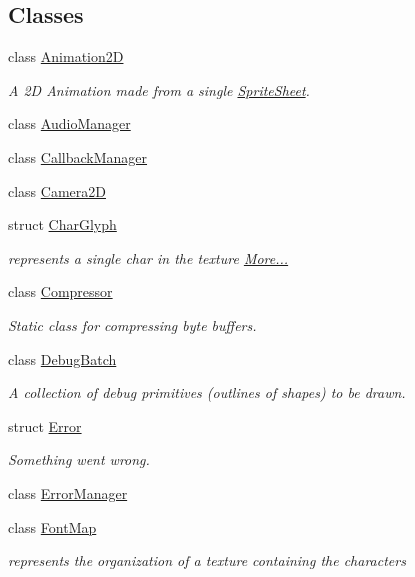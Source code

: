 \subsection*{Classes}
\begin{DoxyCompactItemize}
\item 
class \hyperlink{classnta_1_1Animation2D}{Animation2D}
\begin{DoxyCompactList}\small\item\em A 2D Animation made from a single \hyperlink{structnta_1_1SpriteSheet}{Sprite\+Sheet}. \end{DoxyCompactList}\item 
class \hyperlink{classnta_1_1AudioManager}{Audio\+Manager}
\item 
class \hyperlink{classnta_1_1CallbackManager}{Callback\+Manager}
\item 
class \hyperlink{classnta_1_1Camera2D}{Camera2D}
\item 
struct \hyperlink{namespacenta_d4/d26/structnta_1_1CharGlyph}{Char\+Glyph}
\begin{DoxyCompactList}\small\item\em represents a single char in the texture  \hyperlink{namespacenta_d4/d26/structnta_1_1CharGlyph}{More...}\end{DoxyCompactList}\item 
class \hyperlink{classnta_1_1Compressor}{Compressor}
\begin{DoxyCompactList}\small\item\em Static class for compressing byte buffers. \end{DoxyCompactList}\item 
class \hyperlink{classnta_1_1DebugBatch}{Debug\+Batch}
\begin{DoxyCompactList}\small\item\em A collection of debug primitives (outlines of shapes) to be drawn. \end{DoxyCompactList}\item 
struct \hyperlink{structnta_1_1Error}{Error}
\begin{DoxyCompactList}\small\item\em Something went wrong. \end{DoxyCompactList}\item 
class \hyperlink{classnta_1_1ErrorManager}{Error\+Manager}
\item 
class \hyperlink{classnta_1_1FontMap}{Font\+Map}
\begin{DoxyCompactList}\small\item\em represents the organization of a texture containing the characters \end{DoxyCompactList}\item 

\end{DoxyCompactItemize}
